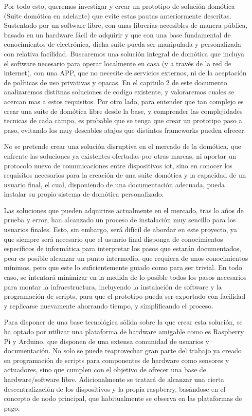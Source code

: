 Por todo esto, queremos investigar y crear un prototipo de solución domótica (Suite domótica en adelante) que evite estas pautas anteriormente descritas. Sustentado por un software libre, con unas librerías accesibles de manera pública, basado en un hardware fácil de adquirir y que con una base fundamental de conocimientos de electrónica, dicha suite pueda ser manipulada y personalizada con relativa facilidad. Buscaremos una solución integral de domótica que incluya el software necesario para operar localmente en casa (y a través de la red de internet), con una APP, que no necesite de servicios externos, ni de la aceptación de políticas de uso privativas y opacas. En el capitulo 2 de este documento analizaremos distitnas soluciones de codigo existente, y valoraremos cuales se acercan mas a estos requisitos. Por otro lado, para entender que tan complejo es crear una suite de domótica libre desde la base, y comprender las complejidades tecnicas de cada campo, es probable que se tenga que crear un prototipo paso a paso, evitando los muy deseables atajos que distintos frameworks pueden ofrecer.

No se pretende crear una solución disruptiva en el mercado de la domótica, que enfrente las soluciones ya existentes ofertadas por otras marcas, ni aportar un protocolo nuevo de comunicaciones entre dispositivos \gls{iot}, sino en conocer los requisitos necesarios para la creación de una suite domótica y la capacidad de un usuario final, el cual, disponiendo de una documentación adecuada, pueda instalar su propio sistema de domótica personalizado.

Las soluciones que pueden adquirirse actualmente en el mercado, tras lo años de prueba y error, han alcanzado un proceso de instalación muy sencillo para los usuarios finales. Esto, sin embargo, será difícil de abordar en este proyecto, ya que siempre será necesario que el usuario final disponga de conocimientos específicos de informática para interpretar los pasos que estarán documentados, peor es posible alcanzar un punto intermedio, que requiera de unos conocimientos mínimos, pero que este lo suficientemente guiado como para ser trivial. En todo caso, se intentará minimizar en la medida de lo posible todos los pasos necesarios para montar la infraestructura, incluyendo la instalación de software y la programación de scripts, para que el prototipo pueda ser exportado con facilidad y replicarse nuevamente ahorrando tiempo, y simplificando el proceso.



Para disponer de una base tecnológica sólida sobre la que crear esta solución, se ha optado por utilizar una plataforma de hardware amigable como es Raspberry Pi y Arduino, que disponen de una extensa comunidad de usuarios y documentación. No solo se puede reaprovechar gran parte del trabajo ya creado en programación de scripts para componentes de hardware como sensores y actuadores, sino que cumplen con el objetivo de ofrecer una base de hardware/software libre. Adicionalmente se tratará de alcanzar una cierta descentralización de los dispositivos y la propia raspberry, basándose en el concepto de nodo principal, que habitualmente se observa en las plataformas de pago.

